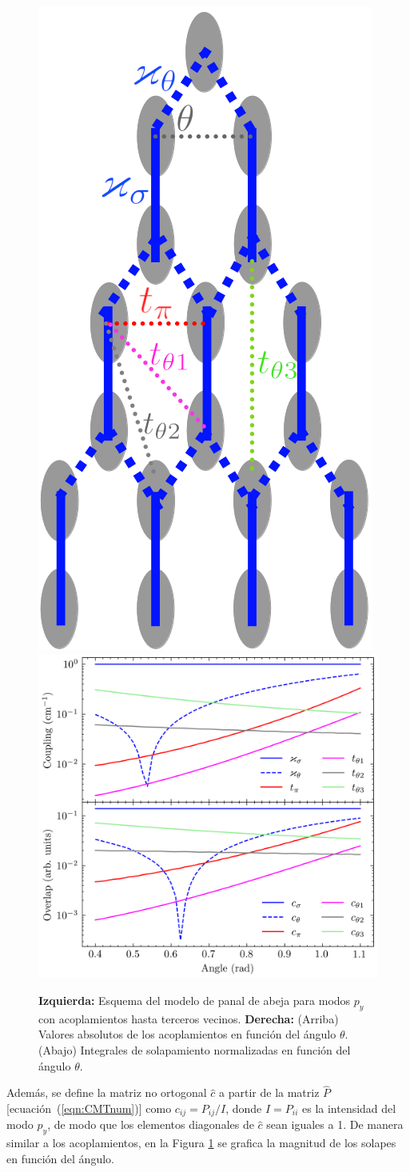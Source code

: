 \begin{figure}[H]
	\centering
	\includegraphics[width=0.25\linewidth]{media/honeycomb-lattice.png}
	\includegraphics[width=0.55\linewidth]{codigo/NNNN_overlap_vs_angle.png}
	\caption[Modelo de panal de abeja para modos $p_y$ con acoplamientos hasta terceros vecinos]{\textbf{Izquierda:} Esquema del modelo de panal de abeja para modos $p_y$ con acoplamientos hasta terceros vecinos. \textbf{Derecha:} (Arriba) Valores absolutos de los acoplamientos en función del ángulo $\theta$. (Abajo) Integrales de solapamiento normalizadas en función del ángulo $\theta$.\label{fig:honeycombmodel}}
\end{figure} \vspace{-3ex} Además, se define la matriz no ortogonal $\hat{c}$ a partir de la matriz $\hat{P}$ [ecuación~(\ref{eqn:CMTnum})] como $c_{ij} = P_{ij}/I$, donde $I = P_{ii}$ es la intensidad del modo $p_y$, de modo que los elementos diagonales de $\hat{c}$ sean iguales a 1. De manera similar a los acoplamientos, en la Figura \ref{fig:honeycombmodel} se grafica la magnitud de los solapes en función del ángulo.


